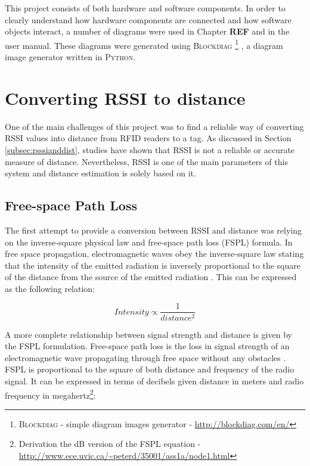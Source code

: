 This project consists of both hardware and software components. In order to clearly understand how hardware components are connected and how software objects interact, a number of diagrams were used in Chapter \textbf{REF} and in the user manual. These diagrams were generated using \textsc{Blockdiag} \footnote{\textsc{Blockdiag} - simple diagram images generator - \url{http://blockdiag.com/en/}} , a diagram image generator written in \textsc{Python}.

\section{Converting RSSI to distance}
\label{sec:rssitodist}

One of the main challenges of this project was to find a reliable way of converting RSSI values into distance from RFID readers to a tag. As discussed in Section \ref{subsec:rsssianddist}, studies have shown that RSSI is not a reliable or accurate measure of distance. Nevertheless, RSSI is one of the main parameters of this system and distance estimation is solely based on it.

\subsection{Free-space Path Loss}

The first attempt to provide a conversion between RSSI and distance was relying on the inverse-square physical law and free-space path loss (FSPL) formula. In free space propagation, electromagnetic waves obey the inverse-square law stating that the intensity of the emitted radiation is inversely proportional to the square of the distance from the source of the emitted radiation \cite[p. 19]{Schlaikjer1962}. This can be expressed as the following relation:

\[ Intensity \propto \frac{1}{distance^{2}} \]

A more complete relationship between signal strength and distance is given by the FSPL formulation. Free-space path loss is the loss in signal strength of an electromagnetic wave propagating through free space without any obstacles \cite{Balanis2012}. FSPL is proportional to the square of both distance and frequency of the radio signal. It can be expressed in terms of decibels given distance in meters and radio frequency in megahertz\footnote{Derivation the dB version of the FSPL equation - \url{http://www.ece.uvic.ca/~peterd/35001/ass1a/node1.html}}: 

